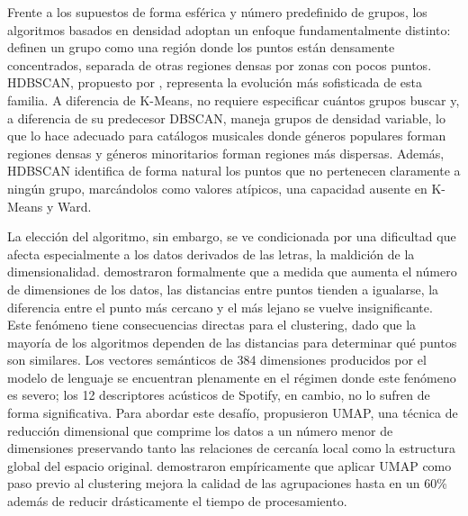 Frente a los supuestos de forma esférica y número predefinido de grupos, los algoritmos basados en densidad adoptan un enfoque fundamentalmente distinto: definen un grupo como una región donde los puntos están densamente concentrados, separada de otras regiones densas por zonas con pocos puntos. HDBSCAN, propuesto por \textcite{campello_2013_hdbscan}, representa la evolución más sofisticada de esta familia. A diferencia de K-Means, no requiere especificar cuántos grupos buscar y, a diferencia de su predecesor DBSCAN, maneja grupos de densidad variable, lo que lo hace adecuado para catálogos musicales donde géneros populares forman regiones densas y géneros minoritarios forman regiones más dispersas. Además, HDBSCAN identifica de forma natural los puntos que no pertenecen claramente a ningún grupo, marcándolos como valores atípicos, una capacidad ausente en K-Means y Ward.

La elección del algoritmo, sin embargo, se ve condicionada por una dificultad que afecta especialmente a los datos derivados de las letras, la maldición de la dimensionalidad. \textcite{aggarwal_2001_dimensionality} demostraron formalmente que a medida que aumenta el número de dimensiones de los datos, las distancias entre puntos tienden a igualarse, la diferencia entre el punto más cercano y el más lejano se vuelve insignificante. Este fenómeno tiene consecuencias directas para el clustering, dado que la mayoría de los algoritmos dependen de las distancias para determinar qué puntos son similares. Los vectores semánticos de 384 dimensiones producidos por el modelo de lenguaje se encuentran plenamente en el régimen donde este fenómeno es severo; los 12 descriptores acústicos de Spotify, en cambio, no lo sufren de forma significativa. Para abordar este desafío, \textcite{mcinnes_2018_umap} propusieron UMAP, una técnica de reducción dimensional que comprime los datos a un número menor de dimensiones preservando tanto las relaciones de cercanía local como la estructura global del espacio original. \textcite{allaoui_2020_umap_clustering} demostraron empíricamente que aplicar UMAP como paso previo al clustering mejora la calidad de las agrupaciones hasta en un 60\% además de reducir drásticamente el tiempo de procesamiento.

